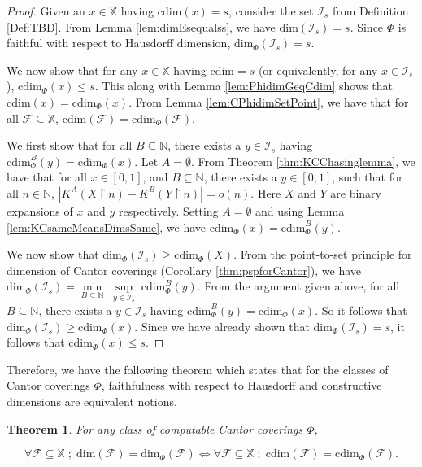 \documentclass[11pt]{article}
\newtheorem{theorem}{Theorem}
\newcommand{\restr}{\upharpoonright}
\newcommand{\N}{\mathbb{N}}
\newcommand{\cdim}{\mathrm{cdim}}
\renewcommand{\dim}{{\mathrm{dim}}}
\newcommand{\F}{{\mathcal{F}}}
\newcommand{\X}{{\mathbb{X}}}
\renewcommand{\F}{\mathcal{F}}
\newcommand{\x}{x}
\begin{document}
\begin{proof}
	Given an $\x \in \X$ having $\cdim(\x) = s$, consider the set $\mathcal{I}_s$ from Definition \ref{Def:TBD}. From Lemma \ref{lem:dimEsequalss}, we have $\dim(\mathcal{I}_s) = s$. Since $\Phi$ is faithful with respect to Hausdorff dimension,  $\dim_\Phi(\mathcal{I}_s) = s$. 
	
	We now   show that for any $\x \in \X$ having $\cdim = s$ (or equivalently, for any $x \in \mathcal{I}_s$), $\cdim_\Phi(\x) \leq s$.
	This along with Lemma \ref{lem:PhidimGeqCdim} shows that $\cdim(\x) = \cdim_\Phi(\x)$. From Lemma \ref{lem:CPhidimSetPoint}, we have that for all $\F \subseteq \X$, $\cdim(\F) = \cdim_{\Phi}(\F)$.
	
	
	We first show that for all $B \subseteq \N$, there exists a $y \in \mathcal{I}_s$  having $\cdim^B_\Phi(y) = \cdim_\Phi(x)$.
	Let $A = \emptyset$. From Theorem \ref{thm:KCChasinglemma}, we have
	that for all  $x \in [0,1]$, and $B \subseteq \N$, there
	exists a $y \in [0,1]$,  such that for all $n \in \N$,
	$|K^A(X \restr n) - K^B(Y \restr n)| = o(n)$. Here $X$ and $Y$ are binary expansions of $x$ and $y$ respectively.
	Setting $A = \emptyset$ and using Lemma \ref{lem:KCsameMeansDimsSame}, we have  $\cdim_\Phi(x) = \cdim^B_\Phi(y)$.
	
	We now show that $\dim_\Phi(\mathcal{I}_s) \geq \cdim_\Phi(X)$.
	From the point-to-set principle for dimension of Cantor coverings (Corollary \ref{thm:pspforCantor}), we have  $	\dim_\Phi(\mathcal{I}_s) = \min\limits_{B \subseteq \N} \; \sup\limits_{y \in \mathcal{I}_s} \; \cdim^B_\Phi(y)$. From the argument given above, for all $B \subseteq \N$, there exists a $y \in \mathcal{I}_s$ having $\cdim^B_\Phi(y) = \cdim_{\Phi}(x)$.
	So it follows that $\dim_{\Phi}(\mathcal{I}_s) \geq \cdim_{\Phi}(x)$.  Since we have already shown that $\dim_\Phi(\mathcal{I}_s) = s$, it follows that $\cdim_\Phi(x) \leq s$.
\end{proof}

Therefore, we have the following theorem which states that for the classes of Cantor coverings $\Phi$, faithfulness with respect to Hausdorff and constructive dimensions are equivalent notions.

\begin{theorem} \label{thm:equivalenceOfFaithfulness}
	For any class of computable Cantor coverings $\Phi$, 
	
	$$\forall \F \subseteq \X \;;\; \dim(\F) = \dim_\Phi(\F) \iff \forall \F \subseteq \X \;;\; \cdim(\F) = \cdim_\Phi(\F).$$ 
\end{theorem}
\end{document}
